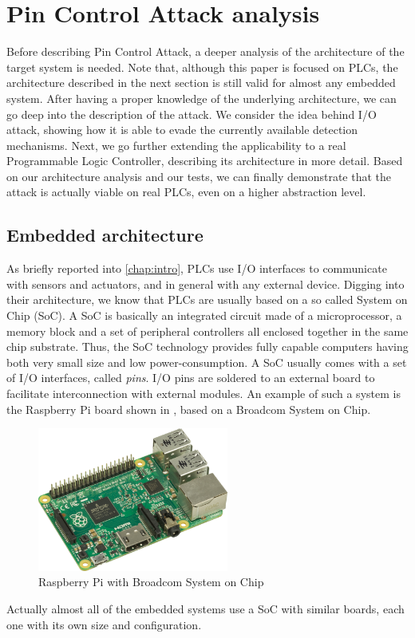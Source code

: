 \chapter{Pin Control Attack analysis}
\label{chap:analysis}

Before describing Pin Control Attack, a deeper analysis of the architecture of the target system is needed.
Note that, although this paper is focused on PLCs, the architecture described in the next section is still valid for almost any embedded system.
After having a proper knowledge of the underlying architecture, we can go deep into the description of the attack.
We consider the idea behind I/O attack, showing how it is able to evade the currently available detection mechanisms.
Next, we go further extending the applicability to a real Programmable Logic Controller, describing its architecture in more detail.
Based on our architecture analysis and our tests, we can finally demonstrate that the attack is actually viable on real PLCs, even on a higher abstraction level.


\section{Embedded architecture}

As briefly reported into \chap \ref{chap:intro}, PLCs use I/O interfaces to communicate with sensors and actuators, and in general with any external device.
Digging into their architecture, we know that PLCs are usually based on a so called System on Chip (SoC).
A SoC is basically an integrated circuit made of a microprocessor, a memory block and a set of peripheral controllers all enclosed together in the same chip substrate.
Thus, the SoC technology provides fully capable computers having both very small size and low power-consumption.
A SoC usually comes with a set of I/O interfaces, called \emph{pins}. I/O pins are soldered to an external board to facilitate interconnection with external modules.
An example of such a system is the Raspberry Pi board shown in \myfig{\ref{fig:raspberry}}, based on a Broadcom System on Chip.
\begin{figure}[h]
\centerline{\includegraphics[width=0.56\textwidth]{res/raspberry}}
\caption{Raspberry Pi \cite{raspberry} with Broadcom System on Chip \label{fig:raspberry}}
\end{figure}
Actually almost all of the embedded systems use a SoC with similar boards, each one with its own size and configuration.

